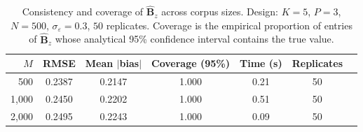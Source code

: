 \begin{table}[t]
\centering
\caption{Consistency and coverage of $\hat{\mathbf{B}}_z$ across corpus sizes. Design: $K=5$, $P=3$, $N=500$, $\sigma_\varepsilon=0.3$, $50$ replicates. Coverage is the empirical proportion of entries of $\hat{\mathbf{B}}_z$ whose analytical 95\% confidence interval contains the true value.}
\label{tab:block1}
\begin{tabular}{rcccccc}
\toprule
$M$ & RMSE & Mean $|$bias$|$ & Coverage (95\%) & Time (s) & Replicates \\
\midrule
500 & 0.2387 & 0.2147 & 1.000 & 0.21 & 50 \\
1,000 & 0.2450 & 0.2202 & 1.000 & 0.51 & 50 \\
2,000 & 0.2495 & 0.2243 & 1.000 & 0.09 & 50 \\
\bottomrule
\end{tabular}
\end{table}

